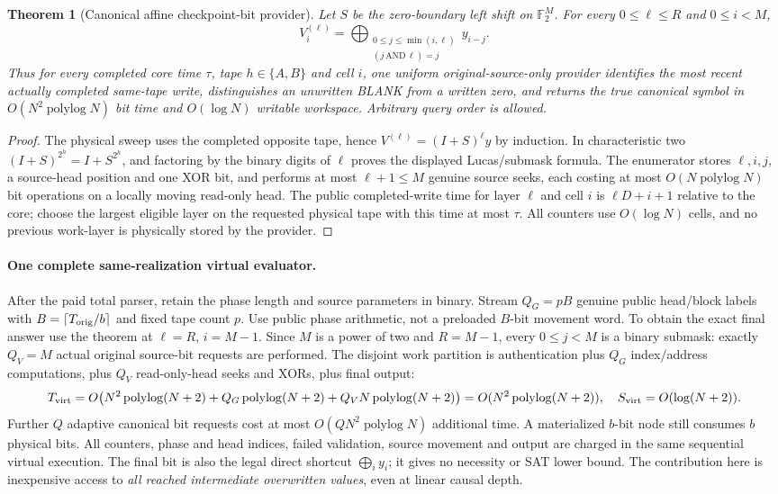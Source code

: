 \documentclass[11pt]{article}
\newtheorem{theorem}{Theorem}
\begin{document}
\begin{theorem}[Canonical affine checkpoint-bit provider]
Let $S$ be the zero-boundary left shift on $\mathbb F_2^M$.
For every $0\le\ell\le R$ and $0\le i<M$,
\[
 V_i^{(\ell)}
 =\bigoplus_{\substack{0\le j\le\min(i,\ell)\\
               (j\,\mathrm{AND}\,\ell)=j}} y_{i-j}.
\]
Thus for every completed core time $\tau$, tape $h\in\{A,B\}$
and cell $i$, one uniform original-source-only provider identifies
the most recent actually completed same-tape write, distinguishes
an unwritten BLANK from a written zero, and returns the true
canonical symbol in $O(N^2\operatorname{polylog}N)$ bit time and
$O(\log N)$ writable workspace. Arbitrary query order is allowed.
\end{theorem}
\begin{proof}
The physical sweep uses the completed opposite tape, hence
$V^{(\ell)}=(I+S)^\ell y$ by induction. In characteristic two
$(I+S)^{2^h}=I+S^{2^h}$, and factoring by the binary digits
of $\ell$ proves the displayed Lucas/submask formula.
The enumerator stores $\ell,i,j$, a source-head position and one
XOR bit, and performs at most $\ell+1\le M$ genuine source seeks,
each costing at most $O(N\operatorname{polylog}N)$ bit operations
on a locally moving read-only head. The public completed-write
time for layer $\ell$ and cell $i$ is $\ell D+i+1$
relative to the core; choose the largest eligible layer on the
requested physical tape with this time at most $\tau$.
All counters use $O(\log N)$ cells, and no previous work-layer
is physically stored by the provider.
\end{proof}

\paragraph{One complete same-realization virtual evaluator.}
After the paid total parser, retain the phase length and source
parameters in binary. Stream $Q_G=pB$ genuine public head/block labels
with $B=\lceil T_{\rm orig}/b\rceil$ and fixed tape count $p$.
Use public phase arithmetic, not a preloaded $B$-bit movement word.
To obtain the exact final answer use the theorem at $\ell=R$,
$i=M-1$. Since $M$ is a power of two and $R=M-1$, every
$0\le j<M$ is a binary submask: exactly $Q_V=M$ actual original
source-bit requests are performed. The disjoint work partition is
authentication plus $Q_G$ index/address computations, plus $Q_V$
read-only-head seeks and XORs, plus final output:
\[
 T_{\rm virt}
 =O\bigl(N^2\operatorname{polylog}(N+2)
      +Q_G\operatorname{polylog}(N+2)+Q_VN\operatorname{polylog}(N+2)\bigr)
 =O(N^2\operatorname{polylog}(N+2)),
\quad S_{\rm virt}=O(\log(N+2)).
\]
Further $Q$ adaptive canonical bit requests cost at most
$O(QN^2\operatorname{polylog}N)$ additional time. A materialized
$b$-bit node still consumes $b$ physical bits. All counters,
phase and head indices, failed validation, source movement and output
are charged in the same sequential virtual execution.
The final bit is also the legal direct shortcut
$\bigoplus_i y_i$; it gives no necessity or SAT lower bound.
The contribution here is inexpensive access to \emph{all reached
intermediate overwritten values}, even at linear causal depth.
\end{document}
